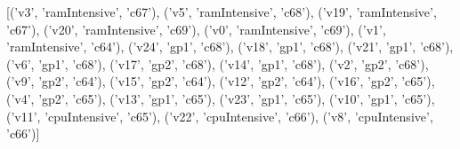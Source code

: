 [('v3', 'ramIntensive', 'c67'), ('v5', 'ramIntensive', 'c68'), ('v19', 'ramIntensive', 'c67'), ('v20', 'ramIntensive', 'c69'), ('v0', 'ramIntensive', 'c69'), ('v1', 'ramIntensive', 'c64'), ('v24', 'gp1', 'c68'), ('v18', 'gp1', 'c68'), ('v21', 'gp1', 'c68'), ('v6', 'gp1', 'c68'), ('v17', 'gp2', 'c68'), ('v14', 'gp1', 'c68'), ('v2', 'gp2', 'c68'), ('v9', 'gp2', 'c64'), ('v15', 'gp2', 'c64'), ('v12', 'gp2', 'c64'), ('v16', 'gp2', 'c65'), ('v4', 'gp2', 'c65'), ('v13', 'gp1', 'c65'), ('v23', 'gp1', 'c65'), ('v10', 'gp1', 'c65'), ('v11', 'cpuIntensive', 'c65'), ('v22', 'cpuIntensive', 'c66'), ('v8', 'cpuIntensive', 'c66')]